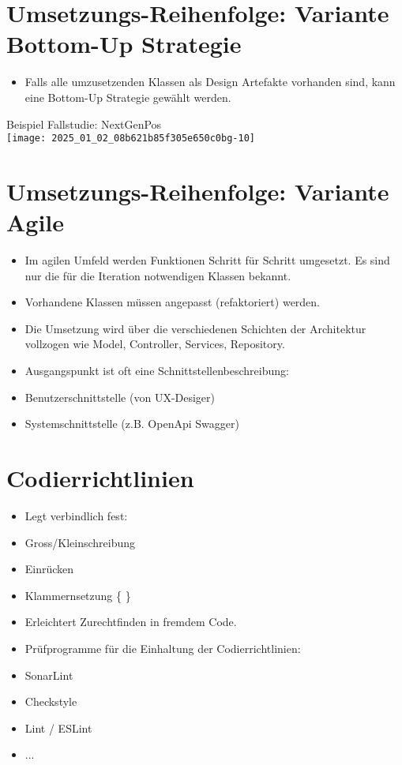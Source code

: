 \documentclass[10pt]{article}
\begin{document}
\section*{Umsetzungs-Reihenfolge: Variante Bottom-Up Strategie}
\begin{itemize}
  \item Falls alle umzusetzenden Klassen als Design Artefakte vorhanden sind, kann eine Bottom-Up Strategie gewählt werden.
\end{itemize}

Beispiel Fallstudie: NextGenPos\\
\texttt{[image: 2025\_01\_02\_08b621b85f305e650c0bg-10]}

\section*{Umsetzungs-Reihenfolge: Variante Agile}
\begin{itemize}
  \item Im agilen Umfeld werden Funktionen Schritt für Schritt umgesetzt. Es sind nur die für die Iteration notwendigen Klassen bekannt.
  \item Vorhandene Klassen müssen angepasst (refaktoriert) werden.
  \item Die Umsetzung wird über die verschiedenen Schichten der Architektur vollzogen wie Model, Controller, Services, Repository.
  \item Ausgangspunkt ist oft eine Schnittstellenbeschreibung:
  \item Benutzerschnittstelle (von UX-Desiger)
  \item Systemschnittstelle (z.B. OpenApi Swagger)
\end{itemize}

\section*{Codierrichtlinien}
\begin{itemize}
  \item Legt verbindlich fest:
  \item Gross/Kleinschreibung
  \item Einrücken
  \item Klammernsetzung \{ \}
  \item Erleichtert Zurechtfinden in fremdem Code.
  \item Prüfprogramme für die Einhaltung der Codierrichtlinien:
  \item SonarLint
  \item Checkstyle
  \item Lint / ESLint
  \item ...
\end{itemize}
\end{document}
